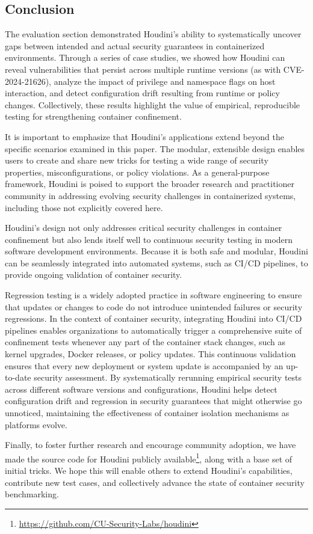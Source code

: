 \documentclass[12pt]{report}
\begin{document}
\begin{doublespace}
\chapter{Conclusion}
The evaluation section demonstrated Houdini's ability to systematically uncover gaps between intended and actual security guarantees in containerized environments. Through a series of case studies, we showed how Houdini can reveal vulnerabilities that persist across multiple runtime versions (as with CVE-2024-21626), analyze the impact of privilege and namespace flags on host interaction, and detect configuration drift resulting from runtime or policy changes. Collectively, these results highlight the value of empirical, reproducible testing for strengthening container confinement.

It is important to emphasize that Houdini's applications extend beyond the specific scenarios examined in this paper. The modular, extensible design enables users to create and share new tricks for testing a wide range of security properties, misconfigurations, or policy violations. As a general-purpose framework, Houdini is poised to support the broader research and practitioner community in addressing evolving security challenges in containerized systems, including those not explicitly covered here.

Houdini's design not only addresses critical security challenges in container confinement but also lends itself well to continuous security testing in modern software development environments. Because it is both safe and modular, Houdini can be seamlessly integrated into automated systems, such as CI/CD pipelines, to provide ongoing validation of container security.

Regression testing is a widely adopted practice in software engineering to ensure that updates or changes to code do not introduce unintended failures or security regressions. In the context of container security, integrating Houdini into CI/CD pipelines enables organizations to automatically trigger a comprehensive suite of confinement tests whenever any part of the container stack changes, such as kernel upgrades, Docker releases, or policy updates. This continuous validation ensures that every new deployment or system update is accompanied by an up-to-date security assessment. By systematically rerunning empirical security tests across different software versions and configurations, Houdini helps detect configuration drift and regression in security guarantees that might otherwise go unnoticed, maintaining the effectiveness of container isolation mechanisms as platforms evolve.

Finally, to foster further research and encourage community adoption, we have made the source code for Houdini publicly available\footnote{\url{https://github.com/CU-Security-Labs/houdini}}, along with a base set of initial tricks. We hope this will enable others to extend Houdini's capabilities, contribute new test cases, and collectively advance the state of container security benchmarking.

\end{doublespace} 	\fontsize{12pt}{14pt} \selectfont
\end{document}
